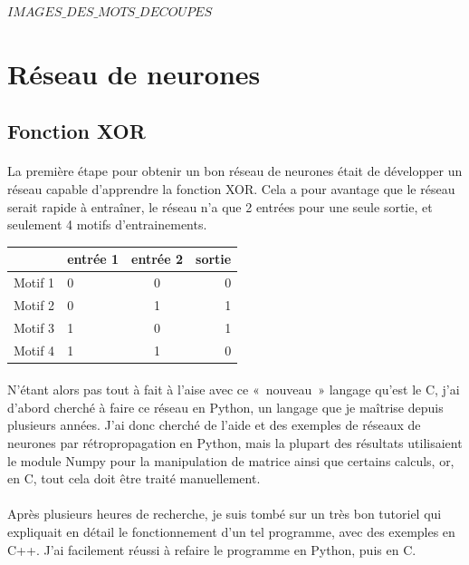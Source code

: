 \documentclass{article}
\begin{document}
	$IMAGES\_DES\_MOTS\_DECOUPES$
	
\newpage

\section{Réseau de neurones}


\subsection{Fonction XOR}

\paragraph{} La première étape pour obtenir un bon réseau de neurones était de développer un réseau capable d'apprendre la fonction XOR. Cela a pour avantage que le réseau serait rapide à entraîner, le réseau n'a que 2 entrées pour une seule sortie, et seulement 4 motifs d'entrainements.

\begin{center}
\vspace*{0.2cm}
\begin{tabular}{|l|l|c|r|}
  \hline
  & entrée 1 & entrée 2 & sortie \\
  \hline
  Motif 1 & 0 & 0 & 0 \\
  Motif 2 & 0 & 1 & 1 \\
  Motif 3 & 1 & 0 & 1 \\
  Motif 4 & 1 & 1 & 0 \\
  \hline
\end{tabular}
\end{center}


\paragraph{}N'étant alors pas tout à fait à l'aise avec ce « nouveau » langage qu'est le C, j'ai d'abord cherché à faire ce réseau en Python, un langage que je maîtrise depuis plusieurs années. J'ai donc cherché de l'aide et des exemples de réseaux de neurones par rétropropagation en Python, mais la plupart des résultats utilisaient le module Numpy pour la manipulation de matrice ainsi que certains calculs, or, en C, tout cela doit être traité manuellement.

\paragraph{}Après plusieurs heures de recherche, je suis tombé sur un très bon tutoriel qui expliquait en détail le fonctionnement d'un tel programme, avec des exemples en C++. J'ai facilement réussi à refaire le programme en Python, puis en C.
\end{document}
